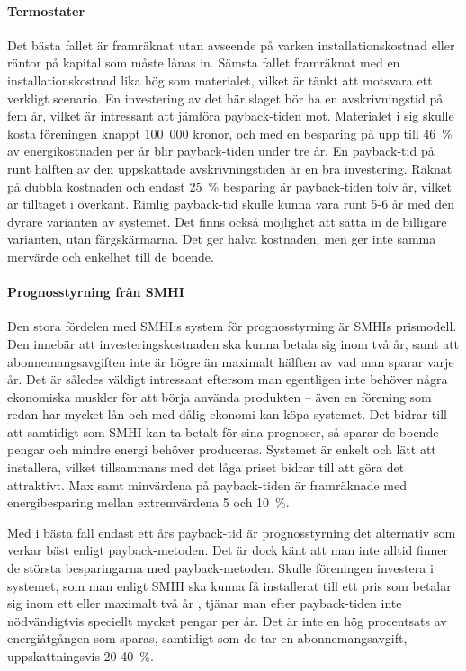\paragraph{Termostater}
Det bästa fallet är framräknat utan avseende på varken installationskostnad eller räntor på kapital som måste lånas in. Sämsta fallet framräknat med en installationskostnad lika hög som materialet, vilket är tänkt att motsvara ett verkligt scenario. En investering av det här slaget bör ha en avskrivningstid på fem år, vilket är intressant att jämföra payback-tiden mot. Materialet i sig skulle kosta föreningen knappt 100~000 kronor, och med en besparing på upp till 46~\% av energikostnaden\cite{danfoss} per år blir payback-tiden under tre år. En payback-tid på runt hälften av den uppskattade avskrivningstiden är en bra investering. Räknat på dubbla kostnaden och endast 25~\% besparing är payback-tiden tolv år, vilket är tilltaget i överkant. Rimlig payback-tid skulle kunna vara runt 5-6 år med den dyrare varianten av systemet. Det finns också möjlighet att sätta in de billigare varianten, utan färgskärmarna. Det ger halva kostnaden, men ger inte samma mervärde och enkelhet till de boende.

\paragraph{Prognosstyrning från SMHI}
Den stora fördelen med SMHI:s system för prognosstyrning är SMHIs prismodell. Den innebär att investeringskostnaden ska kunna betala sig inom två år, samt att abonnemangsavgiften inte är högre än maximalt hälften av vad man sparar varje år. Det är således väldigt intressant eftersom man egentligen inte behöver några ekonomiska muskler för att börja använda produkten – även en förening som redan har mycket lån och med dålig ekonomi kan köpa systemet. Det bidrar till att samtidigt som SMHI kan ta betalt för sina prognoser, så sparar de boende pengar och mindre energi behöver produceras. Systemet är enkelt och lätt att installera, vilket tillsammans med det låga priset bidrar till att göra det attraktivt. Max samt minvärdena på payback-tiden är framräknade med energibesparing mellan extremvärdena 5 och 10~\%.

Med i bästa fall endast ett års payback-tid är prognosstyrning det alternativ som verkar bäst enligt payback-metoden. Det är dock känt att man inte alltid finner de största besparingarna med payback-metoden. Skulle föreningen investera i systemet, som man enligt SMHI ska kunna få installerat till ett pris som betalar sig inom ett eller maximalt två år \cite{smhi1}\cite{smhi2}, tjänar man efter payback-tiden inte nödvändigtvis speciellt mycket pengar per år. Det är inte en hög procentsats av energiåtgången som sparas, samtidigt som de tar en abonnemangsavgift, uppskattningsvis 20-40~\%. \cite{smhi1}\cite{smhi2}

